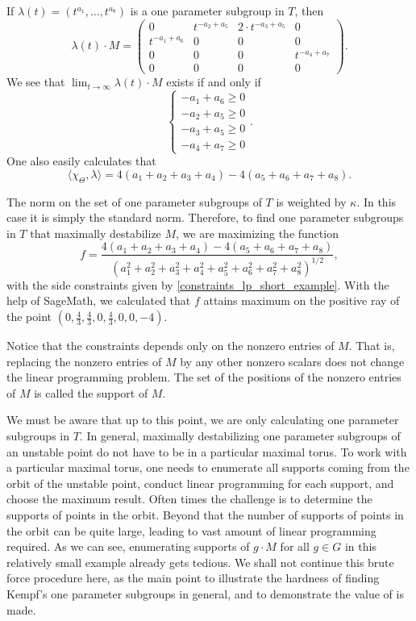 \documentclass[a4paper]{amsart}
\numberwithin{equation}{section}
\theoremstyle{plain}
\theoremstyle{definition}
\begin{document}
If $\lambda(t)=(t^{a_1},\ldots, t^{a_8})$ is a one parameter subgroup in $T$, then $$\lambda(t)\cdot M=
\begin{pmatrix}
0&t^{-a_2+a_5}&2\cdot t^{-a_3+a_5}&0\\
t^{-a_1+a_6}&0&0&0\\
0&0&0&t^{-a_4+a_7}\\
0&0&0&0
\end{pmatrix}.$$ We see that $\lim_{t\rightarrow\infty}\lambda(t)\cdot M$ exists if and only if 
\begin{equation}\label{constraints_lp_short_example}\begin{cases}
-a_1+a_6\geq 0\\
-a_2+a_5\geq 0\\
-a_3+a_5 \geq 0\\
-a_4+a_7\geq 0\end{cases}.\end{equation}
One also easily calculates that $$\langle\chi_{\Theta},\lambda\rangle= 4(a_1+a_2+a_3+a_4)-4(a_5+a_6+a_7+a_8).$$

The norm on the set of one parameter subgroups of $T$ is weighted by $\kappa$. In this case it is simply the standard norm. Therefore, to find one parameter subgroups in $T$ that maximally destabilize $M$, we are maximizing the function 
$$f=\frac{4(a_1+a_2+a_3+a_4)-4(a_5+a_6+a_7+a_8)}{(a_1^2+a_2^2+a_3^2+ a_4^2+a_5^2+a_6^2+a_7^2 +a_8^2)^{1/2}},$$ with the side constraints given by \cref{constraints_lp_short_example}. With the help of SageMath, we calculated that $f$ attains maximum on the positive ray of the point $(0,\frac{4}{3},\frac{4}{3},0,\frac{4}{3},0,0,-4)$. 

Notice that the constraints depends only on the nonzero entries of $M$. That is, replacing the nonzero entries of $M$ by any other nonzero scalars does not change the linear programming problem. The set of the positions of the nonzero entries of $M$ is called the support of $M$.

We must be aware that up to this point, we are only calculating one parameter subgroups in $T$. In general, maximally destabilizing one parameter subgroups of an unstable point do not have to be in a particular maximal torus. To work with a particular maximal torus, one needs to enumerate all supports coming from the orbit of the unstable point,  conduct linear programming for each support, and choose the maximum result. Often times the challenge is to determine the supports of points in the orbit. Beyond that the number of supports of points in the orbit can be quite large, leading to vast amount of linear programming required. As we can see, enumerating supports of $g\cdot M$ for all $g\in G$ in this relatively small example already gets tedious. We shall not continue this brute force procedure here, as the main point to illustrate the hardness of finding Kempf's one parameter subgroups in general, and to demonstrate the value of  is made. 


\appendix
\end{document}
